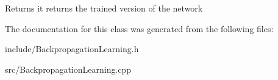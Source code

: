 \begin{DoxyReturn}{Returns}
it returns the trained version of the network 
\end{DoxyReturn}


The documentation for this class was generated from the following files\-:\begin{DoxyCompactItemize}
\item 
include/Backpropagation\-Learning.\-h\item 
src/Backpropagation\-Learning.\-cpp\end{DoxyCompactItemize}
